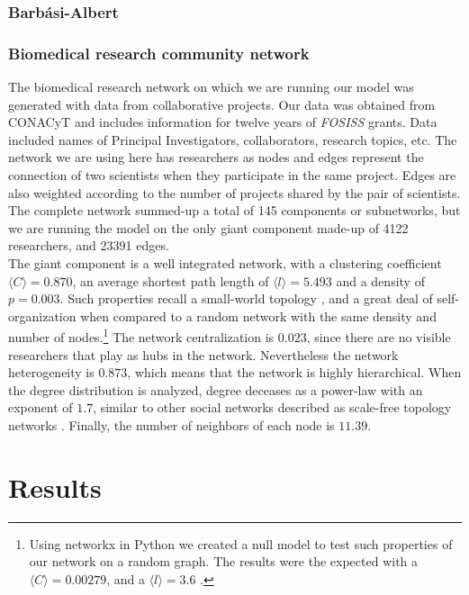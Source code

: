 \subsubsection{Barb\'asi-Albert}

\subsubsection{Biomedical research community network}

The biomedical research network on which we are running our model
was generated with data from collaborative projects. Our data was
obtained from CONACyT and includes information for twelve years of
\textit{FOSISS} grants. Data included names of Principal
Investigators, collaborators, research topics, etc. The network we are
using here has researchers as nodes and edges represent the connection
of two scientists when they participate in the same project. Edges are
also weighted according to the number of projects shared by the pair
of scientists. The complete network summed-up a total of 145
components or subnetworks, but we are running the model on the only
giant component made-up of 4122 researchers, and 23391 edges.\\

The giant component is a well integrated network, with a clustering
coefficient $\langle C \rangle = 0.870$, an average shortest path
length of $\langle l \rangle = 5.493$ and a density of $p = 0.003$. Such
properties recall a small-world topology \cite{Watts1998}, and a great
deal of self-organization when compared to a random network with the
same density and number of nodes.\footnote{Using networkx in Python we
created a null model to test such properties of our network on a
random graph. The results were the expected with a $\langle C
\rangle = 0.00279$, and a $\langle l \rangle = 3.6$
\cite{Watts1998}.} The network centralization is $0.023$, since there
are no visible researchers that play as hubs in the network.
Nevertheless the network heterogeneity is $0.873$, which means that
the network is highly hierarchical. When the degree distribution is
analyzed, degree deceases as a power-law with an exponent of $1.7$,
similar to other social networks described as scale-free topology
networks \cite{Barabasi1999}. Finally, the number of neighbors of each
node is $11.39$.\\  



\section{Results}
\label{sec:3}



